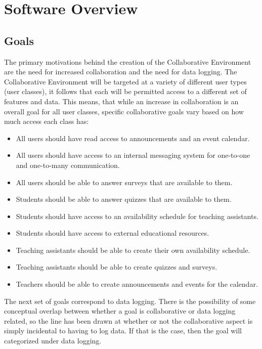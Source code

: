 \chapter{Software Overview}
\label{chap:software-overview}

\section{Goals}
\label{sec:overview-goals}

The primary motivations behind the creation of the Collaborative Environment are the need for increased collaboration and the need for data logging. The Collaborative Environment will be targeted at a variety of different user types (user classes), it follows that each will be permitted access to a different set of features and data. This means, that while an increase in collaboration is an overall goal for all user classes, specific collaborative goals vary based on how much access each class has:

\begin{itemize}
	\item All users should have read access to announcements and an event calendar.
	\item All users should have access to an internal messaging system for one-to-one and one-to-many communication.
	\item All users should be able to answer surveys that are available to them.
	\item Students should be able to answer quizzes that are available to them.
	\item Students should have access to an availability schedule for teaching assistants.
	\item Students should have access to external educational resources.
	\item Teaching assistants should be able to create their own availability schedule.
	\item Teaching assistants should be able to create quizzes and surveys.
	\item Teachers should be able to create announcements and events for the calendar.
\end{itemize}

The next set of goals correspond to data logging. There is the possibility of some conceptual overlap between whether a goal is collaborative or data logging related, so the line has been drawn at whether or not the collaborative aspect is simply incidental to having to log data. If that is the case, then the goal will categorized under data logging.

